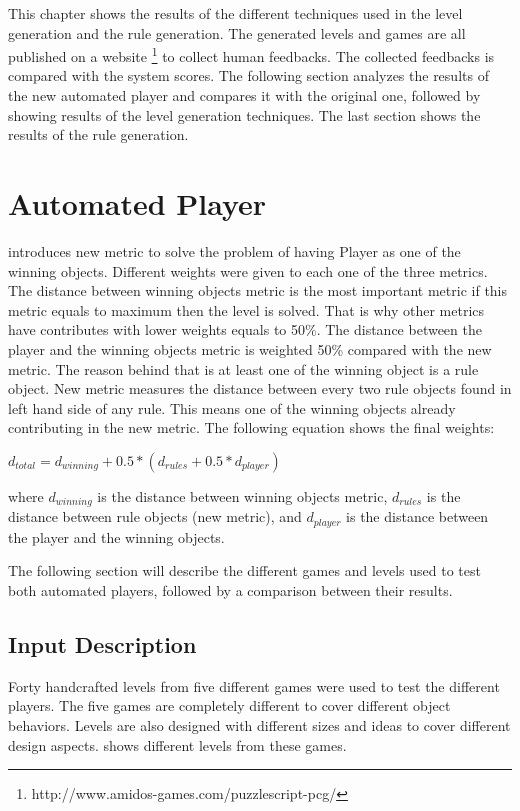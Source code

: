 This chapter shows the results of the different techniques used in the level generation and the rule generation. The generated levels and games are all published on a website \footnote{http://www.amidos-games.com/puzzlescript-pcg/} to collect human feedbacks. The collected feedbacks is compared with the system scores. The following section analyzes the results of the new automated player and compares it with the original one, followed by showing results of the level generation techniques. The last section shows the results of the rule generation.\\\par

\section{Automated Player}
 introduces new metric to solve the problem of having Player as one of the winning objects. Different weights were given to each one of the three metrics. The distance between winning objects metric is the most important metric if this metric equals to maximum then the level is solved. That is why other metrics have contributes with lower weights equals to 50\%. The distance between the player and the winning objects metric is weighted 50\% compared with the new metric. The reason behind that is at least one of the winning object is a rule object. New metric measures the distance between every two rule objects found in left hand side of any rule. This means one of the winning objects already contributing in the new metric. The following equation shows the final weights:
\begin{center}$d_{total} = d_{winning} + 0.5 * (d_{rules} + 0.5 * d_{player})$\end{center}
where $d_{winning}$ is the distance between winning objects metric, $d_{rules}$ is the distance between rule objects (new metric), and $d_{player}$ is the distance between the player and the winning objects.\\\par

The following section will describe the different games and levels used to test both automated players, followed by a comparison between their results.

\subsection{Input Description}
Forty handcrafted levels from five different games were used to test the different players. The five games are completely different to cover different object behaviors. Levels are also designed with different sizes and ideas to cover different design aspects.  shows different levels from these games.

